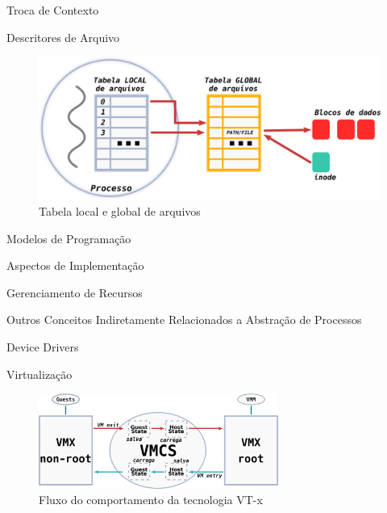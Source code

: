 \documentclass[xcolor={usenames,svgnames,dvipsnames},brazil,english,12pt,aspectratio=149]{beamer}
\begin{document}
\begin{frame}{Troca de Contexto}
\end{frame}

\begin{frame}{Descritores de Arquivo}
	\begin{figure}[!h]
		\centering
		\includegraphics[width=.70\textwidth]{descritores} 
		\caption{Tabela local e global de arquivos}
		\label{fig:descritores} 
	\end{figure}
\end{frame}

\begin{frame}{Modelos de Programação}
\end{frame}

\begin{frame}{Aspectos de Implementação}
\end{frame}

\begin{frame}{Gerenciamento de Recursos}
\end{frame}

\begin{frame}{Outros Conceitos Indiretamente Relacionados a Abstração de Processos}
\end{frame}

\begin{frame}{Device Drivers}
\end{frame}

\begin{frame}{Virtualização}
	\begin{figure}[!h]
		\centering
		\includegraphics[width=0.7\textwidth]{vt-x_flow} 
		\caption{Fluxo do comportamento da tecnologia VT-x}
		\label{fig:vt-x_flow}
	\end{figure}
\end{frame}
\end{document}
